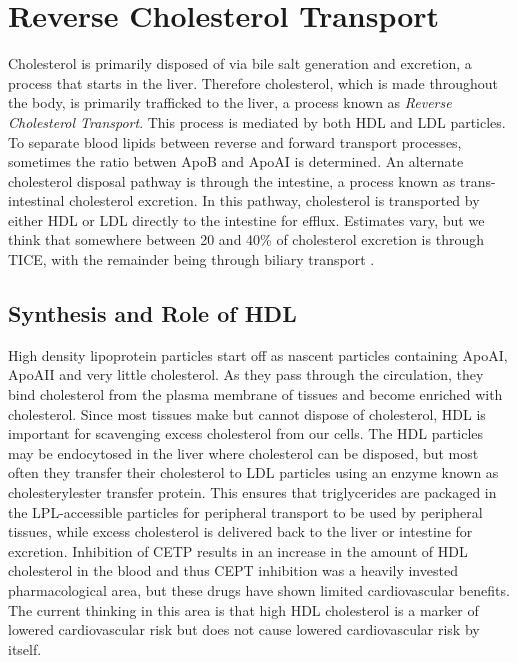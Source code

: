 \documentclass{tufte-handout}
\begin{document}
\section{Reverse Cholesterol Transport}

Cholesterol is primarily disposed of via bile salt generation and excretion, a process that starts in the liver.  Therefore cholesterol, which is made throughout the body, is primarily trafficked to the liver, a process known as \emph{Reverse Cholesterol Transport}.  This process is mediated by both HDL and LDL particles.  To separate blood lipids between reverse and forward transport processes, sometimes the ratio betwen ApoB and ApoAI is determined.  An alternate cholesterol disposal pathway is through the intestine, a process known as trans-intestinal cholesterol excretion.  In this pathway, cholesterol is transported by either HDL or LDL directly to the intestine for efflux.  Estimates vary, but we think that somewhere between 20 and 40\% of cholesterol excretion is through TICE, with the remainder being through biliary transport \citep{Temel2015}.

\subsection{Synthesis and Role of HDL}

High density lipoprotein particles start off as nascent particles containing ApoAI, ApoAII and very little cholesterol.  As they pass through the circulation, they bind cholesterol from the plasma membrane of tissues and become enriched with cholesterol.  Since most tissues make but cannot dispose of cholesterol, HDL is important for scavenging excess cholesterol from our cells. The HDL particles may be endocytosed in the liver where cholesterol can be disposed, but most often they transfer their cholesterol to LDL particles using an enzyme known as cholesterylester transfer protein.  This ensures that triglycerides are packaged in the LPL-accessible particles for peripheral transport to be used by peripheral tissues, while excess cholesterol is delivered back to the liver or intestine for excretion.   Inhibition of CETP results in an increase in the amount of  HDL cholesterol in the blood and thus CEPT inhibition was a heavily invested pharmacological area, but these drugs have shown limited cardiovascular benefits.  The current thinking in this area is that high HDL cholesterol is a marker of lowered cardiovascular risk but does not cause lowered cardiovascular risk by itself.
\end{document}
